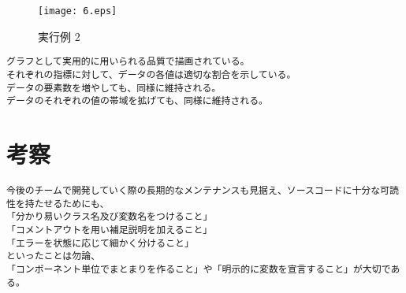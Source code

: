 \documentclass{jarticle}
\begin{document}
\begin{figure}[H]
\begin{center}
\texttt{[image: 6.eps]}
\end{center}
\caption{実行例 2}
\end{figure}

\begin{verbatim}
グラフとして実用的に用いられる品質で描画されている。
それぞれの指標に対して、データの各値は適切な割合を示している。
データの要素数を増やしても、同様に維持される。
データのそれぞれの値の帯域を拡げても、同様に維持される。
\end{verbatim}

\newpage
\section{考察}
\begin{verbatim}
今後のチームで開発していく際の長期的なメンテナンスも見据え、ソースコードに十分な可読性を持たせるためにも、
「分かり易いクラス名及び変数名をつけること」
「コメントアウトを用い補足説明を加えること」
「エラーを状態に応じて細かく分けること」
といったことは勿論、
「コンポーネント単位でまとまりを作ること」や「明示的に変数を宣言すること」が大切である。
\end{verbatim}
\end{document}
